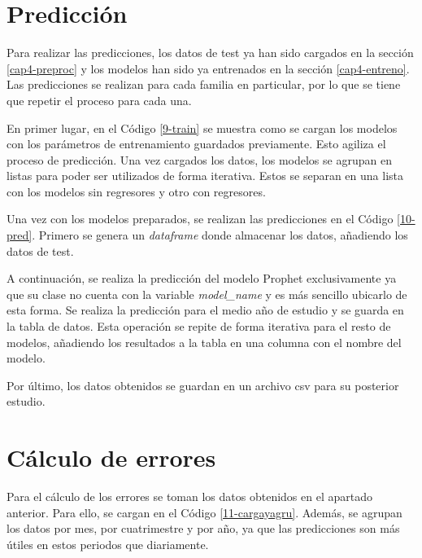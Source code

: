 

\section{Predicción}

Para realizar las predicciones, los datos de test ya han sido cargados en la sección \ref{cap4-preproc} y los modelos han sido ya entrenados en la sección \ref{cap4-entreno}. Las predicciones se realizan para cada familia en particular, por lo que se tiene que repetir el proceso para cada una.

En primer lugar, en el Código \ref{9-train} se muestra como se cargan los modelos con los parámetros de entrenamiento guardados previamente. Esto agiliza el proceso de predicción. Una vez cargados los datos, los modelos se agrupan en listas para poder ser utilizados de forma iterativa. Estos se separan en una lista con los modelos sin regresores y otro con regresores.



Una vez con los modelos preparados, se realizan las predicciones en el Código \ref{10-pred}. Primero se genera un \textit{dataframe} donde almacenar los datos, añadiendo los datos de test.

A continuación, se realiza la predicción del modelo Prophet exclusivamente ya que su clase no cuenta con la variable \textit{model\_name} y es más sencillo ubicarlo de esta forma. Se realiza la predicción para el medio año de estudio y se guarda en la tabla de datos. Esta operación se repite de forma iterativa para el resto de modelos, añadiendo los resultados a la tabla en una columna con el nombre del modelo.

Por último, los datos obtenidos se guardan en un archivo csv para su posterior estudio.



\section{Cálculo de errores}

Para el cálculo de los errores se toman los datos obtenidos en el apartado anterior. Para ello, se cargan en el Código \ref*{11-cargayagru}. Además, se agrupan los datos por mes, por cuatrimestre y por año, ya que las predicciones son más útiles en estos periodos que diariamente. 






